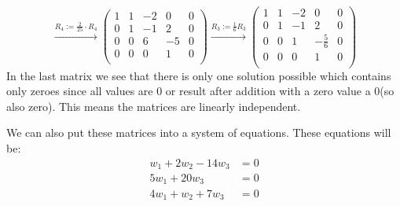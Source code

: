 \documentclass[a4paper]{article}
\begin{document}
\[
\xrightarrow{\text{$R_4:= \frac{2}{25} \cdot R_4$}}
\left(
\begin{array}{cccc|c}
1 & 1 & -2 & 0 & 0 \\
0 & 1 & -1 & 2 & 0 \\
0 & 0 & 6 & -5 & 0 \\
0 & 0 & 0 & 1 & 0 \\
\end{array}
\right)
\xrightarrow{\text{$R_3:= \frac{1}{6} R_3$}}
\left(
\begin{array}{cccc|c}
1 & 1 & -2 & 0 & 0 \\
0 & 1 & -1 & 2 & 0 \\
0 & 0 & 1 & - \frac{5}{6} & 0 \\
0 & 0 & 0 & 1 & 0 \\
\end{array}
\right)
\]
In the last matrix we see that there is only one solution possible which contains only zeroes since all values are 0 or result after addition with a zero value a 0(so also zero). This means the matrices are linearly independent.

We can also put these matrices into a system of equations. These equations will be:
\begin{align*}
  w_1 +  2w_2 -14w_3   &= 0 \\
  5w_1 + 20w_3   &= 0 \\
  4w_1 +  w_2 + 7w_3   &= 0 \\
\end{align*}
\end{document}
